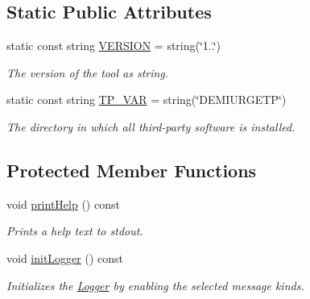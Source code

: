 \subsection*{Static Public Attributes}
\begin{DoxyCompactItemize}
\item 
static const string \hyperlink{classOptions_ab8a901c1ad7d3ab672db099fb4c0b197}{V\-E\-R\-S\-I\-O\-N} = string(\char`\"{}1..\char`\"{})
\begin{DoxyCompactList}\small\item\em The version of the tool as string. \end{DoxyCompactList}\item 
static const string \hyperlink{classOptions_ad3285bfd4c5984cd79988ddce49ee507}{T\-P\-\_\-\-V\-A\-R} = string(\char`\"{}D\-E\-M\-I\-U\-R\-G\-E\-T\-P\char`\"{})
\begin{DoxyCompactList}\small\item\em The directory in which all third-\/party software is installed. \end{DoxyCompactList}\end{DoxyCompactItemize}
\subsection*{Protected Member Functions}
\begin{DoxyCompactItemize}
\item 
void \hyperlink{classOptions_a9fb71bc356f663be2346fb73806aed6b}{print\-Help} () const 
\begin{DoxyCompactList}\small\item\em Prints a help text to stdout. \end{DoxyCompactList}\item 
void \hyperlink{classOptions_a4747e24243c28fcff14f23a9c4f8eecf}{init\-Logger} () const 
\begin{DoxyCompactList}\small\item\em Initializes the \hyperlink{classLogger}{Logger} by enabling the selected message kinds. \end{DoxyCompactList}\end{DoxyCompactItemize}

